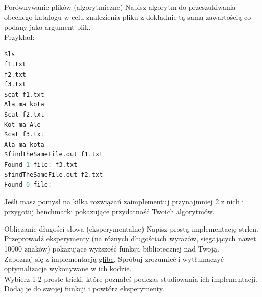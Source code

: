 \begin{exercise}{Porównywanie plików (algorytmiczne)}{}
Napisz algorytm do przeszukiwania obecnego katalogu w celu znalezienia pliku z dokładnie tą samą zawartością co podany jako argument plik. \\

Przykład:
\begin{lstlisting}[language=C,style=C99]
$ls
f1.txt
f2.txt
f3.txt
$cat f1.txt
Ala ma kota
$cat f2.txt
Kot ma Ale
$cat f3.txt
Ala ma kota
$findTheSameFile.out f1.txt
Found 1 file: f3.txt
$findTheSameFile.out f2.txt
Found 0 file:
\end{lstlisting}


Jeśli masz pomysł na kilka rozwiązań zaimplementuj przynajmniej 2 z nich i przygotuj benchmarki pokazujące przydatność Twoich algorytmów.
\end{exercise}

\begin{exercise}{Obliczanie długości słowa (eksperymentalne)}{}
Napisz prostą implementację strlen. \\
Przeprowadź eksperymenty (na różnych długościach wyrazów, sięgających nawet 10000 znaków) pokazujące wyższość funkcji bibliotecznej nad Twoją. \\

Zapoznaj się z implementacją \href{https://github.com/lattera/glibc/blob/master/string/strlen.c}{glibc}.
Spróbuj zrozumieć i wytłumaczyć optymalizacje wykonywane w ich kodzie. \\

Wybierz 1-2 proste tricki, które poznałeś podczas studiowania ich implementacji. Dodaj je do swojej funkcji i powtórz eksperymenty.
\end{exercise}

